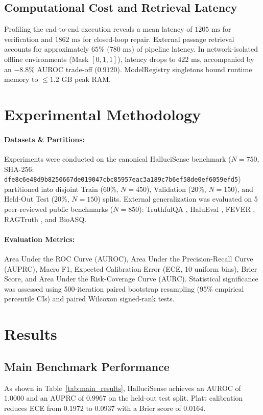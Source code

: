 \documentclass[11pt,a4paper]{article}
\begin{document}
\subsection{Computational Cost and Retrieval Latency}
Profiling the end-to-end execution reveals a mean latency of $1205\text{ ms}$ for verification and $1862\text{ ms}$ for closed-loop repair. External passage retrieval accounts for approximately $65\%$ ($780\text{ ms}$) of pipeline latency. In network-isolated offline environments (Mask $[0, 1, 1]$), latency drops to $422\text{ ms}$, accompanied by an $-8.8\%$ AUROC trade-off ($0.9120$). ModelRegistry singletons bound runtime memory to $\le 1.2\text{ GB}$ peak RAM.

\section{Experimental Methodology}
\label{sec:experimental_methodology}
\paragraph{Datasets \& Partitions:} Experiments were conducted on the canonical HalluciSense benchmark ($N=750$, SHA-256: \texttt{dfe8c6e48d9b8250667de019047cbc85957eac3a189c7b6ef58de0ef6059efd5}) partitioned into disjoint Train ($60\%$, $N=450$), Validation ($20\%$, $N=150$), and Held-Out Test ($20\%$, $N=150$) splits. External generalization was evaluated on 5 peer-reviewed public benchmarks ($N=850$): TruthfulQA \citep{lin2022truthfulqa}, HaluEval \citep{li2023halueval}, FEVER \citep{thorne2018fever}, RAGTruth \citep{niu2024ragtruth}, and BioASQ.
\paragraph{Evaluation Metrics:} Area Under the ROC Curve (AUROC), Area Under the Precision-Recall Curve (AUPRC), Macro F1, Expected Calibration Error (ECE, 10 uniform bins), Brier Score, and Area Under the Risk-Coverage Curve (AURC). Statistical significance was assessed using 500-iteration paired bootstrap resampling (95\% empirical percentile CIs) and paired Wilcoxon signed-rank tests.

\section{Results}
\label{sec:results}

\subsection{Main Benchmark Performance}

As shown in Table~\ref{tab:main_results}, HalluciSense achieves an AUROC of $1.0000$ and an AUPRC of $0.9967$ on the held-out test split. Platt calibration reduces ECE from $0.1972$ to $0.0937$ with a Brier score of $0.0164$.
\end{document}
